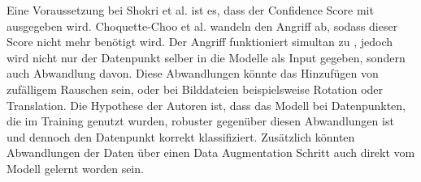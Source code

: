 Eine Voraussetzung bei Shokri et al. \cite{P-2} ist es, dass der Confidence Score mit ausgegeben wird.
Choquette-Choo et al. \cite{P-7} wandeln den Angriff ab, sodass dieser Score nicht mehr benötigt wird.
Der Angriff funktioniert simultan zu \cite{P-2}, jedoch wird nicht nur der Datenpunkt selber in die Modelle als Input gegeben, sondern auch Abwandlung davon. 
Diese Abwandlungen könnte das Hinzufügen von zufälligem Rauschen sein, oder bei Bilddateien beispielsweise Rotation oder Translation.
Die Hypothese der Autoren ist, dass das Modell bei Datenpunkten, die im Training genutzt wurden, robuster gegenüber diesen Abwandlungen ist und dennoch den Datenpunkt korrekt klassifiziert.
Zusätzlich könnten Abwandlungen der Daten über einen Data Augmentation Schritt auch direkt vom Modell gelernt worden sein.

